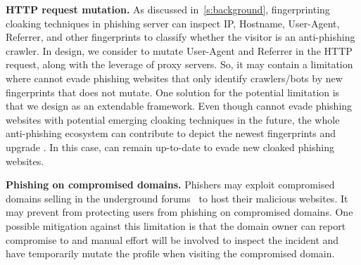 \noindent
\textbf{HTTP request mutation.}
As discussed in~\autoref{s:background}, fingerprinting cloaking techniques in phishing server can inspect IP, Hostname, User-Agent, Referrer, and other fingerprints to classify whether the visitor is an anti-phishing crawler.
In \spartacus design, we consider to mutate User-Agent and Referrer in the HTTP request, along with the leverage of proxy servers.
So, it may contain a limitation where \spartacus cannot evade phishing websites that only identify crawlers/bots by new fingerprints that \spartacus does not mutate.
One solution for the potential limitation is that we design \spartacus as an extendable framework.
Even though \spartacus cannot evade phishing websites with potential emerging cloaking techniques in the future,
the whole anti-phishing ecosystem can contribute to depict the newest fingerprints and upgrade \spartacus.
In this case, \spartacus can remain up-to-date to evade new cloaked phishing websites.

\noindent
\textbf{Phishing on compromised domains.}
Phishers may exploit compromised domains selling in the underground forums~\cite{sun2018understanding, sun2021having} to host their malicious websites.
It may prevent \spartacus from protecting users from phishing on compromised domains.
One possible mitigation against this limitation is that the domain owner can report compromise to \spartacus and manual effort will be involved to inspect the incident and have \spartacus temporarily mutate the profile when visiting the compromised domain.


